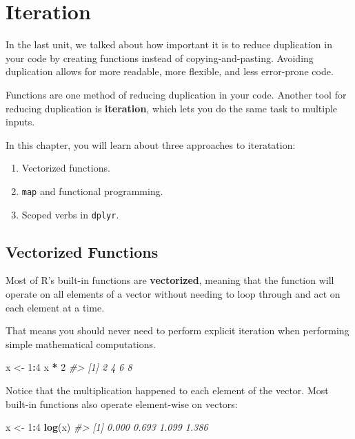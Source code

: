 \documentclass[]{book}
\newenvironment{Shaded}{\begin{snugshade}}{\end{snugshade}}
\newcommand{\KeywordTok}[1]{\textcolor[rgb]{0.13,0.29,0.53}{\textbf{#1}}}
\newcommand{\DecValTok}[1]{\textcolor[rgb]{0.00,0.00,0.81}{#1}}
\newcommand{\StringTok}[1]{\textcolor[rgb]{0.31,0.60,0.02}{#1}}
\newcommand{\CommentTok}[1]{\textcolor[rgb]{0.56,0.35,0.01}{\textit{#1}}}
\newcommand{\OperatorTok}[1]{\textcolor[rgb]{0.81,0.36,0.00}{\textbf{#1}}}
\newcommand{\NormalTok}[1]{#1}
\providecommand{\tightlist}{%
  \setlength{\itemsep}{0pt}\setlength{\parskip}{0pt}}
\begin{document}
\hypertarget{iteration}{\section{Iteration}\label{iteration}}

In the last unit, we talked about how important it is to reduce
duplication in your code by creating functions instead of
copying-and-pasting. Avoiding duplication allows for more readable, more
flexible, and less error-prone code.

Functions are one method of reducing duplication in your code. Another
tool for reducing duplication is \textbf{iteration}, which lets you do
the same task to multiple inputs.

In this chapter, you will learn about three approaches to iteratation:

\begin{enumerate}
\def\labelenumi{\arabic{enumi}.}
\tightlist
\item
  Vectorized functions.
\item
  \texttt{map} and functional programming.
\item
  Scoped verbs in \texttt{dplyr}.
\end{enumerate}

\subsection{Vectorized Functions}\label{vectorized-functions}

Most of R's built-in functions are \textbf{vectorized}, meaning that the
function will operate on all elements of a vector without needing to
loop through and act on each element at a time.

That means you should never need to perform explicit iteration when
performing simple mathematical computations.

\begin{Shaded}
\begin{Highlighting}[]
\NormalTok{x <-}\StringTok{ }\DecValTok{1}\OperatorTok{:}\DecValTok{4}
\NormalTok{x }\OperatorTok{*}\StringTok{ }\DecValTok{2}
\CommentTok{#> [1] 2 4 6 8}
\end{Highlighting}
\end{Shaded}

Notice that the multiplication happened to each element of the vector.
Most built-in functions also operate element-wise on vectors:

\begin{Shaded}
\begin{Highlighting}[]
\NormalTok{x <-}\StringTok{ }\DecValTok{1}\OperatorTok{:}\DecValTok{4}
\KeywordTok{log}\NormalTok{(x)}
\CommentTok{#> [1] 0.000 0.693 1.099 1.386}
\end{Highlighting}
\end{Shaded}
\end{document}
